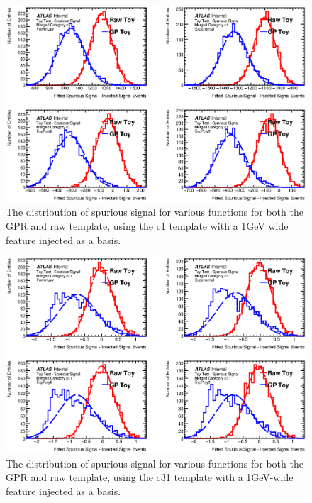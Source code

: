 \begin{figure} 
\begin{center}
    \includegraphics[width=\textwidth]{figures/background/gpr/validation/ToyTest_FitSigVals_Merged_Category_c1Sig.eps}
     \caption{The distribution of spurious signal for various functions for both the GPR and raw template, using the c1 template with a 1GeV wide feature injected as a basis.}
\label{fig:c1Sig}
\end{center}
\end{figure}

\begin{figure} 
\begin{center}
  \includegraphics[width=\textwidth]{figures/background/gpr/validation/ToyTest_FitSigVals_Merged_Category_c31Sig.eps}  
    \caption{The distribution of spurious signal for various functions for both the GPR and raw template, using the c31 template with a 1GeV-wide feature injected as a basis.}
\label{fig:c31Sig}
\end{center}
\end{figure}

